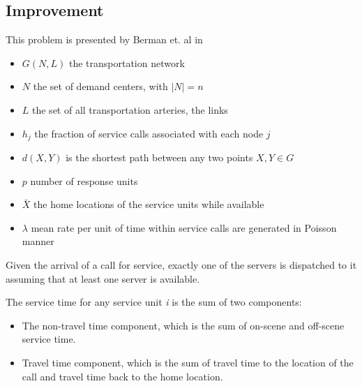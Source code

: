 \subsection{Improvement}
\begin{frame}
This problem is presented by Berman et. al in \cite{berman1987stochastic}

\begin{itemize}
\item $G(N,L)$ the transportation network
\item $N$ the set of demand centers, with $|N| = n$
\item $L$ the set of all transportation arteries, the links
\item $h_j$ the fraction of service calls associated with each node $j$
\item $d(X,Y)$ is the shortest path between any two points $X,Y \in G$
\item $p$ number of response units
\item $\bar{X}$ the home locations of the service units while available
\item $\lambda$ mean rate per unit of time within service calls are generated in Poisson manner
\end{itemize}
\end{frame}

\begin{frame}
Given the arrival of a call for service,
exactly one of the servers is dispatched to it 
assuming that at least one server is available.

The service time for any service unit \textit{i}
is the sum of two components:
\begin{itemize}
\item The non-travel time component, 
  which is the sum of on-scene and off-scene service time.
\item Travel time component, which is the sum of travel time
  to the location of the call and travel time back to the home location.
\end{itemize}
\end{frame}

